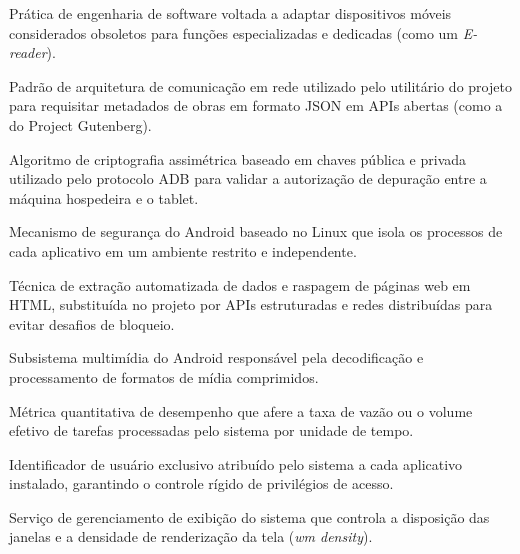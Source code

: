 \begin{description}[leftmargin=3.5cm, style=nextline]
     \item[\textbf{Repurposing (\textit{Ressignificação de Hardware})}] Prática de engenharia de software voltada a adaptar dispositivos móveis considerados obsoletos para funções especializadas e dedicadas (como um \textit{E-reader}).

     \item[\textbf{REST (\textit{Representational State Transfer})}] Padrão de arquitetura de comunicação em rede utilizado pelo utilitário do projeto para requisitar metadados de obras em formato JSON em APIs abertas (como a do Project Gutenberg).

     \item[\textbf{RSA}] Algoritmo de criptografia assimétrica baseado em chaves pública e privada utilizado pelo protocolo ADB para validar a autorização de depuração entre a máquina hospedeira e o tablet.

     \item[\textbf{Sandbox}] Mecanismo de segurança do Android baseado no Linux que isola os processos de cada aplicativo em um ambiente restrito e independente.

     \item[\textbf{Scraping (\textit{Web Scraping})}] Técnica de extração automatizada de dados e raspagem de páginas web em HTML, substituída no projeto por APIs estruturadas e redes distribuídas para evitar desafios de bloqueio.

     \item[\textbf{Stagefright / Codec2}] Subsistema multimídia do Android responsável pela decodificação e processamento de formatos de mídia comprimidos.

     \item[\textbf{Throughput}] Métrica quantitativa de desempenho que afere a taxa de vazão ou o volume efetivo de tarefas processadas pelo sistema por unidade de tempo.

     \item[\textbf{UID (\textit{User Identifier})}] Identificador de usuário exclusivo atribuído pelo sistema a cada aplicativo instalado, garantindo o controle rígido de privilégios de acesso.

     \item[\textbf{Window Manager (\textit{WM})}] Serviço de gerenciamento de exibição do sistema que controla a disposição das janelas e a densidade de renderização da tela (\textit{wm density}).

\end{description}

